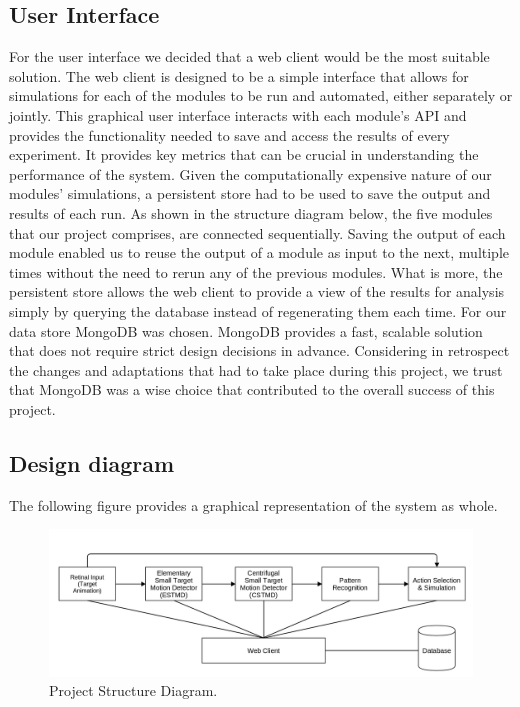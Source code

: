 \documentclass[a4paper,11pt]{article}
\begin{document}
\subsection{User Interface}
For the user interface we decided that a web client would be the most suitable solution. The web client is designed to be a simple interface that allows for simulations for each of the modules to be run and automated, either separately or jointly. This graphical user interface interacts with each module's API and provides the functionality needed to save and access the results of every experiment. It provides key metrics that can be crucial in understanding the performance of the system.
Given the computationally expensive nature of our modules' simulations, a persistent store had to be used to save the output and results of each run. As shown in the structure diagram below, the five modules that our project comprises, are connected sequentially. Saving the output of each module enabled us to reuse the output of a module as input to the next, multiple times without the need to rerun any of the previous modules. What is more, the persistent store allows the web client to provide a view of the results for analysis simply by querying the database instead of regenerating them each time.
For our data store MongoDB was chosen. MongoDB provides a fast, scalable solution that does not require strict design decisions in advance. Considering in retrospect the changes and adaptations that had to take place during this project, we trust that MongoDB was a wise choice that contributed to the overall success of this project.


\subsection{Design diagram}
The following figure provides a graphical representation of the system as whole. 

\begin{figure}[hb]
\centering
\includegraphics[scale = 0.35]{designblockdiagram2}
\caption{Project Structure Diagram.}
\end{figure}
\end{document}
